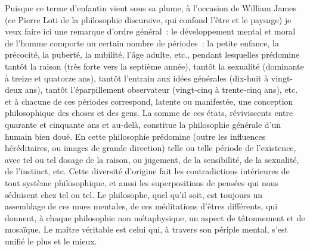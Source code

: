 \documentclass[french,twoside]{book} %
\begin{document}
Puisque ce terme d’enfantin vient sous sa plume, à l’occasion de William James (ce Pierre Loti de la philosophie discursive, qui confond l’être et le paysage) je veux faire ici une remarque d’ordre général : le développement mental et moral de l’homme comporte un certain nombre de périodes : la petite enfance, la précocité, la puberté, la nubilité, l’âge adulte, etc., pendant lesquelles prédomine tantôt la raison (très forte vers la septième année), tantôt la sexualité (dominante à treize et quatorze ans), tantôt l’entrain aux idées générales (dix-huit à vingt-deux ans), tantôt l’éparpillement observateur (vingt-cinq à trente-cinq ans), etc. et à chacune de ces périodes correspond, latente ou manifestée, une conception philosophique des choses et des gens. La somme de ces états, réviviscents entre quarante et cinquante ans et au-delà, constitue la philosophie générale d’un humain bien doué. En cette philosophie prédomine (outre les influences héréditaires, ou images de grande direction) telle ou telle période de l’existence, avec tel ou tel dosage de la raison, ou jugement, de la sensibilité, de la sexualité, de l’instinct, etc. Cette diversité d’origine fait les contradictions intérieures de tout système philosophique, et aussi les superpositions de pensées qui nous séduisent chez tel ou tel. Le philosophe, quel qu’il soit, est toujours un assemblage de ces mues mentales, de ces méditations d’êtres différents, qui donnent, à chaque philosophie non métaphysique, un aspect de tâtonnement et de mosaïque. Le maître véritable est celui qui, à travers son périple mental, s’est unifié le plus et le mieux.\par
\end{document}
